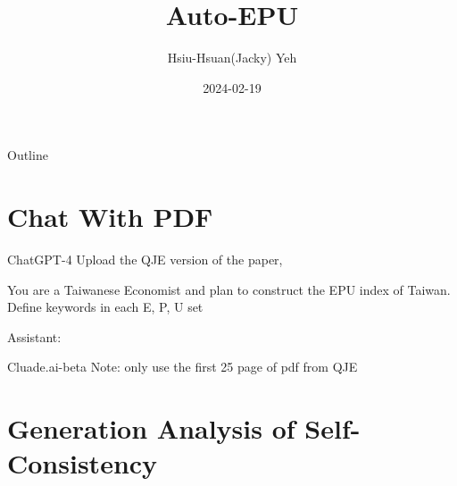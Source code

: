 \documentclass[12pt]{beamer}
\title{\huge{Auto-EPU}}
\author{Hsiu-Hsuan(Jacky) Yeh}
\date{2024-02-19}
\begin{document}
\maketitle


\begin{frame}{Outline}
\tableofcontents
\end{frame}


\section{Chat With PDF}
\begin{frame}{ChatGPT-4}
    Upload the QJE version of the paper, \cite{Baker2016}


You are a Taiwanese Economist and plan to construct the EPU index of Taiwan.
Define keywords in each E, P, U set

Assistant:

\begin{table}[H]
\renewcommand\arraystretch{1.2}
\begin{adjustwidth}{-0.1cm}{}
\begin{center}
\setlength{\tabcolsep}{30pt}
{
    \fontsize{10}{10} \selectfont
    
}
\end{center}
\end{adjustwidth}
\end{table}
\end{frame}


\begin{frame}{Cluade.ai-beta}
Note: only use the first 25 page of pdf from QJE
\begin{table}[H]
\renewcommand\arraystretch{1.2}
\begin{adjustwidth}{-0.1cm}{}
\begin{center}
\setlength{\tabcolsep}{30pt}
{
    \fontsize{10}{10} \selectfont
    
}
\end{center}
\end{adjustwidth}
\end{table}
\end{frame}


\section{Generation Analysis of Self-Consistency}
\end{document}
